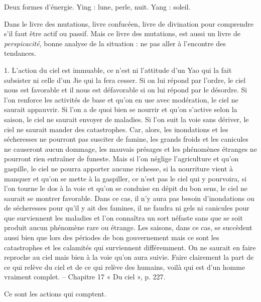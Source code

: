 \begin{Def}
    Deux formes d'énergie. Ying : lune, perle, nuit. Yang : soleil.
\end{Def}
Dans le livre des mutations, livre confucéen, livre de divination pour comprendre s'il faut être actif ou passif. Mais ce livre des mutations, est aussi un livre de \textit{perspicacité}, bonne analyse de la situation : ne pas aller à l'encontre des tendances. 
\begin{singlequote}
    1.	L’action du ciel est immuable, ce n’est ni l’attitude d’un Yao qui la fait subsister ni celle d’un Jie qui la fera cesser. Si on lui répond par l’ordre, le ciel nous est favorable et il nous est défavorable si on lui répond par le désordre. Si l’on renforce les activités de base et qu’on en use avec modération, le ciel ne saurait appauvrir. Si l’on a de quoi bien se nourrir et qu’on s’active selon la saison, le ciel ne saurait envoyer de maladies. Si l’on suit la voie sans dériver, le ciel ne saurait mander des catastrophes. Car, alors, les inondations et les sécheresses ne pourront pas susciter de famine, les grands froids et les canicules ne causeront aucun dommage, les mauvais présages et les phénomènes étranges ne pourront rien entraîner de funeste. Mais si l’on néglige l’agriculture et qu’on gaspille, le ciel ne pourra apporter aucune richesse, si la nourriture vient à manquer et qu’on se mette à la gaspiller, ce n’est pas le ciel qui y pourvoira, si l’on tourne le dos à la voie et qu’on se conduise en dépit du bon sens, le ciel ne saurait se montrer favorable. Dans ce cas, il n’y aura pas besoin d’inondations ou de sécheresses pour qu’il y ait des famines, il ne faudra ni gels ni canicules pour que surviennent les maladies et l’on connaîtra un sort néfaste sans que se soit produit aucun phénomène rare ou étrange. Les saisons, dans ce cas, se succèdent aussi bien que lors des périodes de bon gouvernement mais ce sont les catastrophes et les calamités qui surviennent différemment. On ne saurait en faire reproche au ciel mais bien à la voie qu’on aura suivie. Faire clairement la part de ce qui relève du ciel et de ce qui relève des humains, voilà qui est d’un homme vraiment complet.
-- Chapitre 17 « Du ciel », p. 227.
\end{singlequote}


Ce sont les actions qui comptent.


